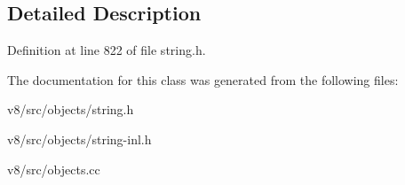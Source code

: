 \subsection{Detailed Description}


Definition at line 822 of file string.\+h.



The documentation for this class was generated from the following files\+:\begin{DoxyCompactItemize}
\item 
v8/src/objects/string.\+h\item 
v8/src/objects/string-\/inl.\+h\item 
v8/src/objects.\+cc\end{DoxyCompactItemize}
